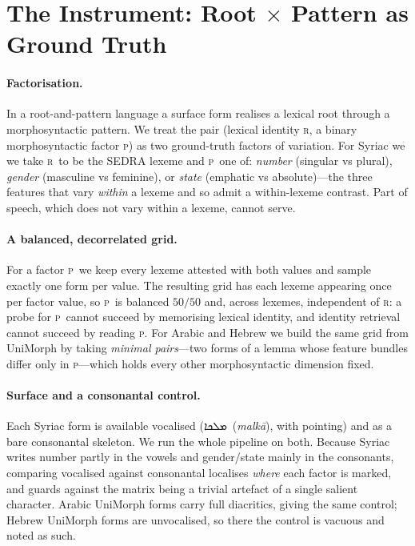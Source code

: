 \documentclass[11pt]{article}
\providecommand{\syriacfont}{}
\providecommand{\RL}[1]{#1}
\newcommand{\syrscript}[1]{{\syriacfont\RL{#1}}}
\newcommand{\syrt}[2]{\syrscript{#1}~(\textit{#2})}
\newcommand{\R}{\textsc{r}}
\newcommand{\Pp}{\textsc{p}}
\begin{document}
\section{The Instrument: Root \texorpdfstring{$\times$}{x} Pattern as Ground Truth}
\label{sec:instrument}

\paragraph{Factorisation.}
In a root-and-pattern language a surface form realises a lexical root through a
morphosyntactic pattern. We treat the pair (lexical identity \R, a binary
morphosyntactic factor \Pp) as two ground-truth factors of variation. For Syriac we
we take \R\ to be the SEDRA lexeme \citep{kiraz1994sedra,sedraproject} and \Pp\ one of: \emph{number} (singular vs
plural), \emph{gender} (masculine vs feminine), or \emph{state} (emphatic vs
absolute)---the three features that vary \emph{within} a lexeme and so admit a
within-lexeme contrast. Part of speech, which does not vary within a lexeme, cannot
serve.

\paragraph{A balanced, decorrelated grid.}
For a factor \Pp\ we keep every lexeme attested with both values and sample exactly
one form per value. The resulting grid has each lexeme appearing once per factor
value, so \Pp\ is balanced $50/50$ and, across lexemes, independent of \R: a probe
for \Pp\ cannot succeed by memorising lexical identity, and identity retrieval
cannot succeed by reading \Pp. For Arabic and Hebrew we build the same grid from
UniMorph by taking \emph{minimal pairs}---two forms of a lemma whose feature bundles
differ only in \Pp---which holds every other morphosyntactic dimension fixed.

\paragraph{Surface and a consonantal control.}
Each Syriac form is available vocalised (\syrt{ܡܠܟܐ}{malk\=a}, with pointing) and as a
bare consonantal skeleton. We run the whole pipeline on both. Because Syriac writes
number partly in the vowels and gender/state mainly in the consonants, comparing
vocalised against consonantal localises \emph{where} each factor is marked, and
guards against the matrix being a trivial artefact of a single salient character.
Arabic UniMorph forms carry full diacritics, giving the same control; Hebrew
UniMorph forms are unvocalised, so there the control is vacuous and noted as such.
\end{document}

